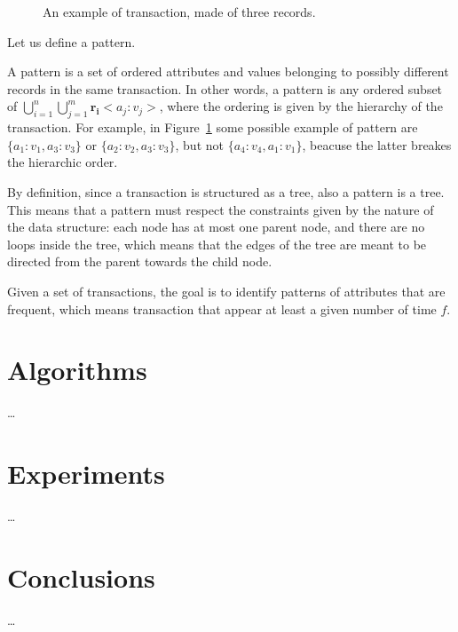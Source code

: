 \documentclass{acm_proc_article-sp-sigmod09}
\begin{document}
\begin{figure}
\centering
{}
\caption{An example of transaction, made of three records.}
\label{fig:transaction}
\end{figure}

Let us define a pattern.
\begin{definition}
A pattern is a set of ordered attributes and values belonging to possibly different records in the same transaction. In other words, a pattern is any ordered subset of $\bigcup\limits_{i=1}^{n} \bigcup\limits_{j=1}^{m} \boldsymbol{r_i}<a_j \colon v_j>$, where the ordering is given by the hierarchy of the transaction. For example, in Figure~\ref{fig:transaction} some possible example of pattern are $\{a_1 \colon v_1, a_3 \colon v_3\}$ or $\{a_2 \colon v_2, a_3 \colon v_3\}$, but not $\{a_4 \colon v_4, a_1 \colon v_1\}$, beacuse the latter breakes the hierarchic order.

By definition, since a transaction is structured as a tree, also a pattern is a tree. This means that a pattern must respect the constraints given by the nature of the data structure: each node has at most one parent node, and there are no loops inside the tree, which means that the edges of the tree are meant to be directed from the parent towards the child node.
\end{definition}

Given a set of transactions, the goal is to identify patterns of attributes that are frequent, which means transaction that appear at least a given number of time $f$.

\section{Algorithms}
\dots

\section{Experiments}
\dots

\section{Conclusions}
\dots

%

\end{document}
